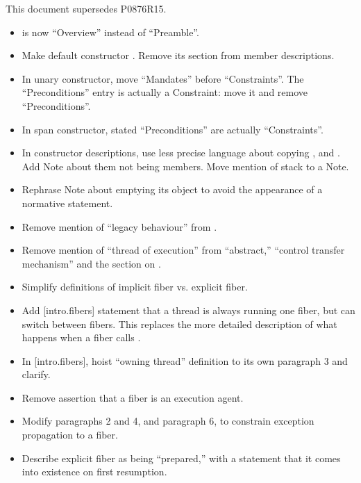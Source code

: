\label{history}
This document supersedes P0876R15.


\begin{itemize}
    \item {} is now ``Overview'' instead of ``Preamble''.
    \item Make default \fiber constructor .
          Remove its section from member descriptions.
    \item In unary constructor, move ``Mandates'' before ``Constraints''. The
          ``Preconditions'' entry is actually a Constraint: move it and remove
          ``Preconditions''.
    \item In span constructor, stated ``Preconditions'' are actually ``Constraints''.
    \item In constructor descriptions, use less precise language about copying
          ,  and . Add Note about them not
          being \fiber members. Move mention of stack to a Note.
    \item Rephrase \resumewith Note about emptying its \fiber object to avoid
          the appearance of a normative statement.
    \item Remove mention of ``legacy behaviour'' from
          .
    \item Remove mention of ``thread of execution'' from ``abstract,''
          ``control transfer mechanism'' and the section on \exfns.
    \item Simplify definitions of implicit fiber vs. explicit fiber.
    \item Add [intro.fibers] statement that a thread is always running one
          fiber, but can switch between fibers. This replaces the more
          detailed description of what happens when a fiber calls \anyresume.
    \item In [intro.fibers], hoist ``owning thread'' definition to its own
          paragraph 3 and clarify.
    \item Remove assertion that a fiber is an execution agent.
    \item Modify  paragraphs 2 and 4, and 
          paragraph 6, to constrain exception propagation to a fiber.
    \item Describe explicit fiber as being ``prepared,'' with a statement that
          it comes into existence on first resumption.

\end{itemize}
